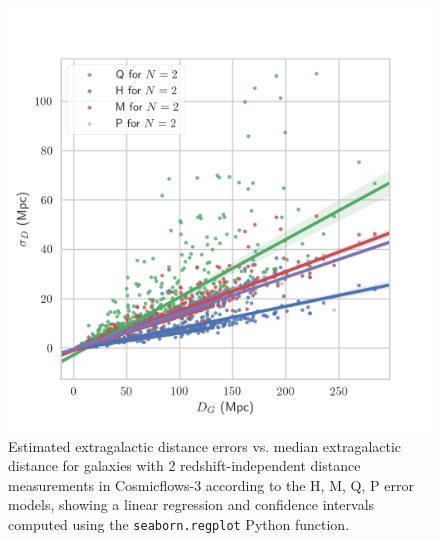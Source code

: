 \documentclass[a4paper,fleqn,usenatbib]{mnras}
\begin{document}
\begin{figure}
	\includegraphics[scale=0.7]{CF3low.png}
    \caption{Estimated extragalactic distance errors vs. median extragalactic distance for galaxies with 2 redshift-independent distance measurements in Cosmicflows-3 according to the H, M, Q, P error models, showing a linear regression and confidence intervals computed using the \texttt{seaborn.regplot} Python function.}
    \label{fig:CF3low}
\end{figure}
\end{document}
